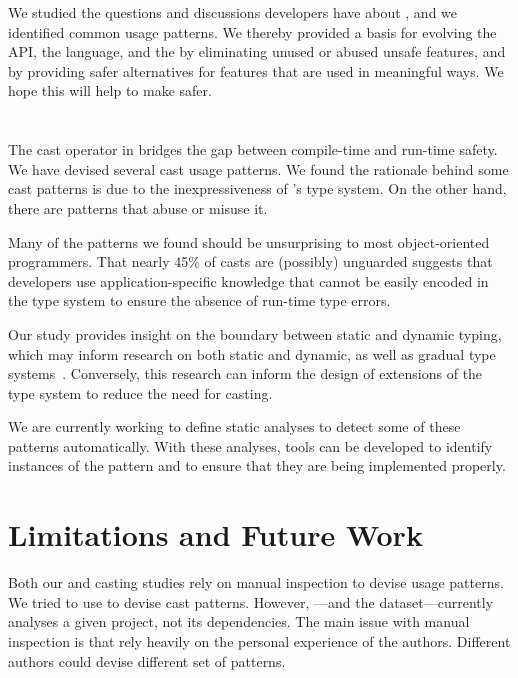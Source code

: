 We studied the questions and discussions developers have about \unsafe{},
and we identified common usage patterns.
We thereby provided a basis for evolving the \unsafe{} API, the \java{} language, and the \jvm{}
by eliminating unused or abused unsafe features,
and by providing safer alternatives for features that are used in meaningful ways.
We hope this will help to make \unsafe{} safer.

\section*{}

The cast operator in \java{} bridges the gap between compile-time and run-time safety.
We have devised several cast usage patterns.
We found the rationale behind some cast patterns is due to the inexpressiveness of \java{}'s type system.
On the other hand,
there are patterns that abuse or misuse it.

Many of the patterns we found should be unsurprising to most object-oriented programmers.
That nearly 45\% of casts are (possibly) unguarded 
suggests that developers use application-specific knowledge that cannot be easily encoded in
the type system to ensure the absence of run-time type errors.

Our study provides insight on the boundary between static and dynamic typing,
which may inform research on both static and dynamic,
as well as gradual type systems~\citep{Siek06gradualtyping}.
Conversely, this research can inform the design of extensions of the \java{} type system to reduce the need for casting.

We are currently working to define static analyses to detect some of these patterns automatically.
With these analyses,
tools can be developed to identify instances of the pattern and to ensure that they are being implemented properly.

\section*{Limitations and Future Work}

Both our \unsafe{} and casting studies rely on manual inspection to devise usage patterns.
We tried to use \ql{} to devise cast patterns.
However, \ql{}---and the \lgtm{} dataset---currently analyses a given project,
not its dependencies.
The main issue with manual inspection is that rely heavily on the personal experience of the authors.
Different authors could devise different set of patterns.

